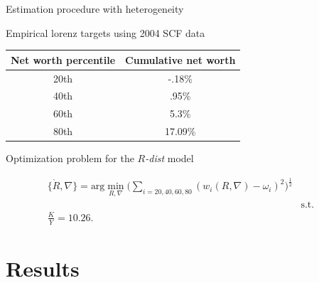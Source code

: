 \documentclass{beamer}
\begin{document}
\begin{frame}{Estimation procedure with heterogeneity}

\small
\par Empirical lorenz targets using 2004 SCF data \vspace{2mm}

\centering
\begin{tabular}{|c|c|}
\hline
Net worth percentile & Cumulative net worth \\
\hline
20th & -.18\%  \\
40th &  .95\% \\
60th &  5.3\% \\
80th &  17.09\% \\
\hline
\end{tabular}

\begin{flushleft}
\par Optimization problem for the $R$\textit{-dist} model 
\end{flushleft}

\vspace{-7.5mm}
 \begin{eqnarray*}
  \{\grave{R}, \nabla\} = \text{arg}\min_{R, \nabla} \bigg( \sum_{i=20, 40, 60, 80} (w_{i}(R, \nabla)-\omega_i )^{2} \bigg)^{\frac{1}{2}}\\
  &\text{s.t.}& \\
  \frac{K}{Y} = 10.26. %
\end{eqnarray*}


\end{frame}

\section{Results}
\end{document}
